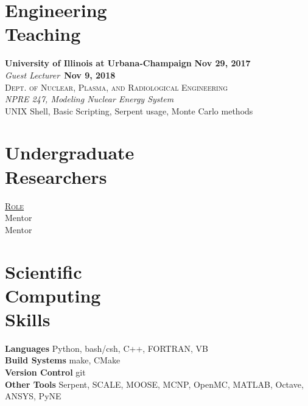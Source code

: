 \documentclass[margin,line]{resume}
\begin{document}
\begin{resume}
    \section{\mysidestyle Engineering\\Teaching}
    \textbf{University of Illinois at Urbana-Champaign} \hfill \textbf{Nov 29, 2017}\\
    \textsl{Guest Lecturer}~\hfill \textbf{Nov 9, 2018}\\
    \textsc{Dept. of Nuclear, Plasma, and Radiological Engineering}\\ 
               \textsl{NPRE 247, Modeling Nuclear Energy System}\\
               UNIX Shell, Basic Scripting, Serpent usage, Monte Carlo methods
               \vspace{2mm}
    \section{\mysidestyle Undergraduate\\Researchers}
    \hfill\textsc{\underline{Role}}\\
    \hfill Mentor\\
    \hfill Mentor\\
    \section{\mysidestyle Scientific\\Computing\\Skills}
                \textbf{Languages} \hfill Python, bash/csh, C++, FORTRAN, VB \vspace{.5mm}\\%
                \textbf{Build Systems} \hfill make, CMake\vspace{.5mm}\\%
                \textbf{Version Control} \hfill git\vspace{.5mm}\\%
                \textbf{Other Tools} \hfill Serpent, SCALE, MOOSE, MCNP, 
                OpenMC, MATLAB, Octave, ANSYS, PyNE \vspace{.5mm}%


\end{resume}
\end{document}
